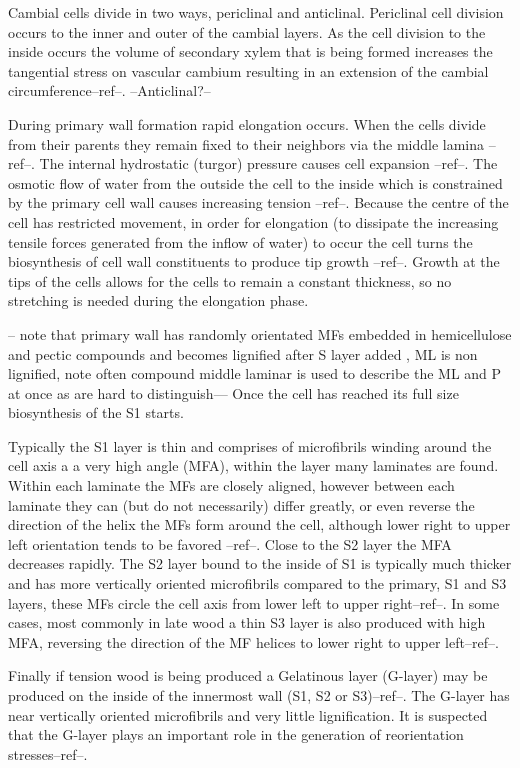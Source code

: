\documentclass{article}
\begin{document}
Cambial cells divide in two ways, periclinal and anticlinal. Periclinal cell
division occurs to the inner and outer of the cambial layers. As the cell
division to the inside occurs the volume of secondary xylem that is being formed
increases the tangential stress on vascular cambium resulting in an extension of
the cambial circumference--ref--. --Anticlinal?--

During primary wall formation rapid elongation occurs. When the cells divide
from their parents they remain fixed to their neighbors via the middle lamina
--ref--. The internal hydrostatic (turgor) pressure causes cell expansion
--ref--. The osmotic flow of water from the outside the cell to the inside which
is constrained by the primary cell wall causes increasing tension --ref--.
Because the centre of the cell has restricted movement, in order for elongation
(to dissipate the increasing tensile forces generated from the inflow of water)
to occur the cell turns the biosynthesis of cell wall constituents to produce
tip growth --ref--. Growth at the tips of the cells allows for the cells to
remain a constant thickness, so no stretching is needed during the elongation
phase.

-- note that primary wall has randomly orientated MFs embedded
in hemicellulose and pectic compounds and becomes lignified after S layer added
, ML is non lignified, note often compound middle laminar is used to describe
the ML and P at once as are hard to distinguish--- Once the cell has reached its
full size biosynthesis of the S1 starts.

Typically the S1 layer is thin and comprises of microfibrils winding around the
cell axis a a very high angle (MFA), within the layer many laminates are found.
Within each laminate the MFs are closely aligned, however between each laminate
they can (but do not necessarily) differ greatly, or even reverse the direction
of the helix the MFs form around the cell, although lower right to upper left
orientation tends to be favored --ref--. Close to the S2 layer the MFA decreases
rapidly. The S2 layer bound to the inside of S1 is typically much thicker and
has more vertically oriented microfibrils compared to the primary, S1 and S3
layers, these MFs circle the cell axis from lower left to upper right--ref--. In
some cases, most commonly in late wood a thin S3 layer is also produced with
high MFA, reversing the direction of the MF helices to lower right to upper
left--ref--.

Finally if tension wood is being produced a Gelatinous layer (G-layer)
may be produced on the inside of the innermost wall (S1, S2 or S3)--ref--. The
G-layer has near vertically oriented microfibrils and very little lignification.
It is suspected that the G-layer plays an important role in the generation of
reorientation stresses--ref--.
\end{document}
